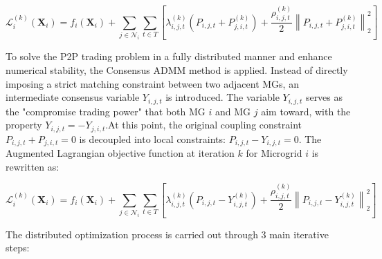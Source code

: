 \documentclass[preprint,12pt]{elsarticle}
\begin{document}
\begin{equation}
    \mathcal{L}_i^{(k)}(\boldsymbol{X}_i) = f_i(\boldsymbol{X}_i) + \sum_{j \in \mathcal{N}_i} \sum_{t \in T} \left[ \lambda_{i,j,t}^{(k)} \left( P_{i,j,t} + P_{j,i,t}^{(k)} \right) + \frac{\rho_{i,j,t}^{(k)}}{2} \left\| P_{i,j,t} + P_{j,i,t}^{(k)} \right\|_2^2 \right] 
\end{equation}

To solve the P2P trading problem in a fully distributed manner and enhance numerical stability, the Consensus ADMM method is applied. Instead of directly imposing a strict matching constraint between two adjacent MGs, an intermediate consensus variable $Y_{i,j,t}$ is introduced. The variable $Y_{i,j,t}$ serves as the "compromise trading power" that both MG $i$ and MG $j$ aim toward, with the property $Y_{i,j,t} = -Y_{j,i,t}$.At this point, the original coupling constraint $P_{i,j,t} + P_{j,i,t} = 0$ is decoupled into local constraints: $P_{i,j,t} - Y_{i,j,t} = 0$. The Augmented Lagrangian objective function at iteration $k$ for Microgrid $i$ is rewritten as:

\begin{equation}
    \mathcal{L}_i^{(k)}(\boldsymbol{X}_i) = f_i(\boldsymbol{X}_i) + \sum_{j \in \mathcal{N}_i} \sum_{t \in T} \left[ \lambda_{i,j,t}^{(k)} \left( P_{i,j,t} - Y_{i,j,t}^{(k)} \right) + \frac{\rho_{i,j,t}^{(k)}}{2} \left\| P_{i,j,t} - Y_{i,j,t}^{(k)} \right\|_2^2 \right] 
    \label{eq:admm_lagrangian}
\end{equation}

The distributed optimization process is carried out through 3 main iterative steps:
\end{document}
